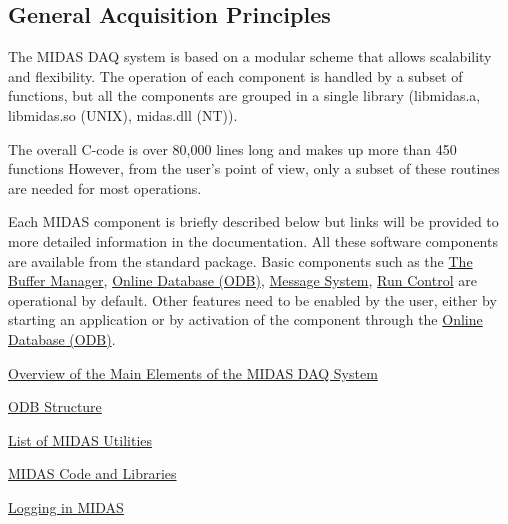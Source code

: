 

\par
\hypertarget{Features_F_Midas_Overview_Intro}{}\subsection{General Acquisition Principles}\label{Features_F_Midas_Overview_Intro}
The MIDAS DAQ system is based on a modular scheme that allows scalability and flexibility. The operation of each component is handled by a subset of functions, but all the components are grouped in a single library (libmidas.a, libmidas.so (UNIX), midas.dll (NT)).

The overall C-\/code is over 80,000 lines long and makes up more than 450 functions However, from the user's point of view, only a subset of these routines are needed for most operations.

Each MIDAS component is briefly described below but links will be provided to more detailed information in the documentation. All these software components are available from the standard package. Basic components such as the \hyperlink{F_MainElements_F_Buffer_Manager_overview}{The Buffer Manager}, \hyperlink{F_MainElements_F_Online_Database_overview}{Online Database (ODB)}, \hyperlink{F_MainElements_F_Message_System_overview}{Message System}, \hyperlink{F_MainElements_F_Run_Control_overview}{Run Control} are operational by default. Other features need to be enabled by the user, either by starting an application or by activation of the component through the \hyperlink{F_MainElements_F_Online_Database_overview}{Online Database (ODB)}. \par
 \par



\begin{DoxyItemize}
\item \hyperlink{F_MainElements}{Overview of the Main Elements of the MIDAS DAQ System}
\item \hyperlink{F_ODB_Structure}{ODB Structure}
\item \hyperlink{F_Utilities_List}{List of MIDAS Utilities}
\item \hyperlink{F_Midas_Code_and_Libraries}{MIDAS Code and Libraries}
\item \hyperlink{F_Logging}{Logging in MIDAS} \par

\end{DoxyItemize}

\par
 \label{index_end}
\hypertarget{index_end}{}
